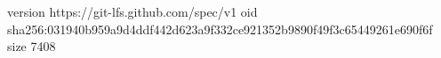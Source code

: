 version https://git-lfs.github.com/spec/v1
oid sha256:031940b959a9d4ddf442d623a9f332ce921352b9890f49f3c65449261e690f6f
size 7408
